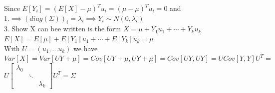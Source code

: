 \documentclass[18pt]{article}
\begin{document}
\begin{flushleft}
\vspace{.4cm}
Since $E[Y_i]=(E[X]-\mu)^T u_i=(\mu-\mu)^T u_i=0$ and $1. \implies (diag(\Sigma))_i=\lambda_i \implies Y_i \sim N(0,\lambda_i)$\\
\vspace{.4cm}
3. Show X can bee written is the form $X=\mu+Y_1 u_1+\cdots+Y_k u_k$\\
\vspace{.4cm}
$E[X]=E[\mu]+E[Y_1]u_1+\cdots+E[Y_k]u_k=\mu$\\
\vspace{.4cm}
With $U=(u_1,...u_k)$ we have\\
\vspace{.4cm}
$Var[X]=Var[UY+\mu]=Cov[UY+\mu,UY+\mu]=Cov[UY,UY]=U Cov[Y,Y] U^T=$\\
\vspace{.4cm}
$U\begin{bmatrix}
    \lambda_0 & & \\
    & \ddots & \\
    & &  \lambda_k
\end{bmatrix}U^T=\Sigma$\\


\end{flushleft}
\end{document}
